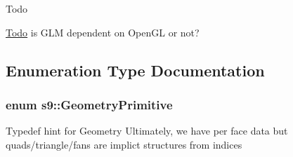 \begin{DoxyRefDesc}{\-Todo}
\item[\hyperlink{todo__todo000023}{\-Todo}]is \-G\-L\-M dependent on \-Open\-G\-L or not? \end{DoxyRefDesc}


\subsection{\-Enumeration \-Type \-Documentation}
\hypertarget{namespaces9_ad57d1332f8fd67d23f6a1d3520ab785c}{
\subsubsection[{\-Geometry\-Primitive}]{\setlength{\rightskip}{0pt plus 5cm}enum {\bf s9\-::\-Geometry\-Primitive}}}\label{namespaces9_ad57d1332f8fd67d23f6a1d3520ab785c}
\-Typedef hint for \-Geometry \-Ultimately, we have per face data but quads/triangle/fans are implict structures from indices 